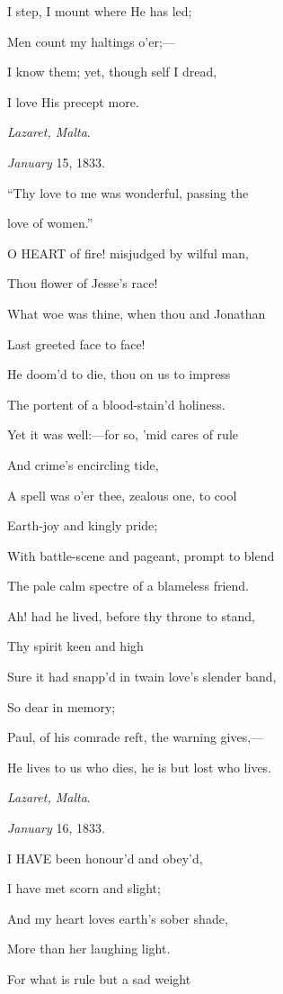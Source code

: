 I step, I mount where He has led;

Men count my haltings o'er;—

I know them; yet, though self I dread,

I love His precept more.

\emph{Lazaret, Malta}.

\emph{January} 15, 1833.


``Thy love to me was wonderful, passing the

love of women.''

O HEART of fire! misjudged by wilful man,

Thou flower of Jesse's race!

What woe was thine, when thou and Jonathan

Last greeted face to face!

He doom'd to die, thou on us to impress

The portent of a blood-stain'd holiness.

Yet it was well:—for so, 'mid cares of rule

And crime's encircling tide,

A spell was o'er thee, zealous one, to cool

Earth-joy and kingly pride;

With battle-scene and pageant, prompt to blend

The pale calm spectre of a blameless friend.

Ah! had he lived, before thy throne to stand,

Thy spirit keen and high

Sure it had snapp'd in twain love's slender band,

So dear in memory;

Paul, of his comrade reft, the warning gives,—

He lives to us who dies, he is but lost who lives.

\emph{Lazaret, Malta}.

\emph{January} 16, 1833.


I HAVE been honour'd and obey'd,

I have met scorn and slight;

And my heart loves earth's sober shade,

More than her laughing light.

For what is rule but a sad weight

